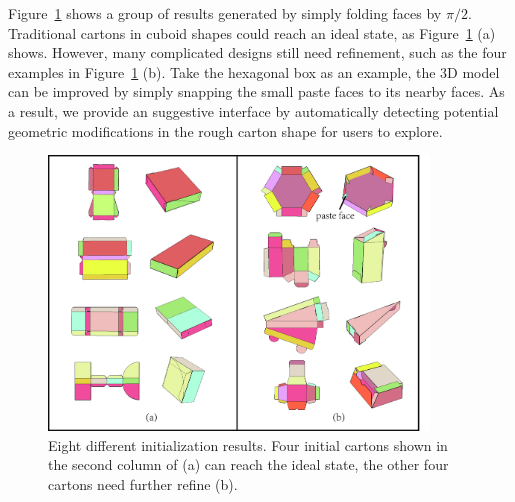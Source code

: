 Figure~\ref{fig:initial} shows a group of results generated by simply folding faces by $\pi/2$.
Traditional cartons in cuboid shapes could reach an ideal state, as Figure~\ref{fig:initial} (a) shows.
However, many complicated designs still need refinement, such as the four examples in Figure~\ref{fig:initial} (b). 
Take the hexagonal box as an example, the 3D model can be improved by simply snapping the small paste faces to its nearby faces. %
%
As a result, we provide an suggestive interface by automatically detecting potential geometric modifications in the rough carton shape for users to explore.

\begin{figure}
	\centering
	\includegraphics[width=0.9\textwidth]{images/initial.jpg}
	\caption{Eight different initialization results. Four initial cartons shown in the second column of (a) can reach the ideal state, the other four cartons need further refine (b).}
	\label{fig:initial}
\end{figure}

